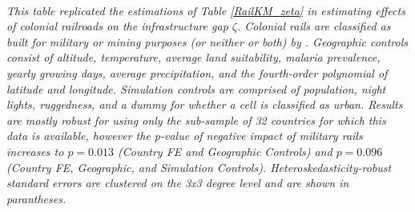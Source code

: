 \documentclass[11pt, oneside]{article}   	%
\begin{document}
\begin{table}[]
\justify
\textit{\\ \footnotesize This table replicated the estimations of Table \ref{RailKM_zeta} in estimating effects of colonial railroads on the infrastructure gap $\zeta$. Colonial rails are classified as built for military or mining purposes (or neither or both) by \cite{jedwab_permanent_2016}. Geographic controls consist of altitude, temperature, average land suitability, malaria prevalence, yearly growing days, average precipitation, and the fourth-order polynomial of latitude and longitude. Simulation controls are comprised of population, night lights, ruggedness, and a dummy for whether a cell is classified as urban. Results are mostly robust for using only the sub-sample of 32 countries for which this data is available, however the p-value of negative impact of military rails increases to $p=0.013$ (Country FE and Geographic Controls) and $p=0.096$ (Country FE, Geographic, and Simulation Controls). Heteroskedasticity-robust standard errors are clustered on the 3x3 degree level and are shown in parantheses.}
\end{table}




\newpage
\begin{spacing}{1.0}
\setlength{\bibsep}{2.5pt plus 1.5ex}

\end{spacing}
\end{document}
